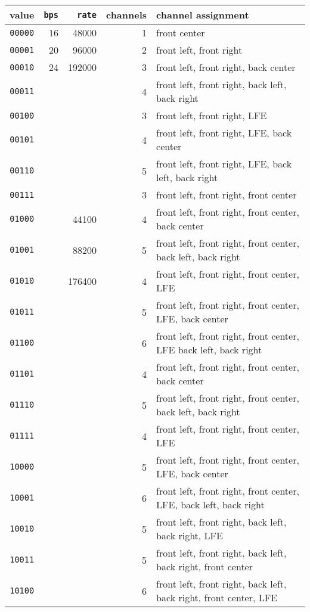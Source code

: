 \begin{small}
  \begin{tabular}{|c|r|r|r|l|}
    \hline
    value & \texttt{bps} & \texttt{rate} & channels & channel assignment \\
    \hline
    \texttt{00000} & 16 & 48000 & 1 & front center \\
    \texttt{00001} & 20 & 96000 & 2 & front left, front right\\
    \texttt{00010} & 24 & 192000 & 3 & front left, front right, back center \\
    \texttt{00011} & & & 4 & front left, front right, back left, back right\\
    \texttt{00100} & & & 3 & front left, front right, LFE \\
    \texttt{00101} & & & 4 & front left, front right, LFE, back center \\
    \texttt{00110} & & & 5 & front left, front right, LFE, back left, back right \\
    \texttt{00111} & & & 3 & front left, front right, front center \\
    \texttt{01000} & & 44100 & 4 & front left, front right, front center, back center \\
    \texttt{01001} & & 88200 & 5 & front left, front right, front center, back left, back right \\
    \texttt{01010} & & 176400 & 4 & front left, front right, front center, LFE\\
    \texttt{01011} & & & 5 & front left, front right, front center, LFE, back center \\
    \texttt{01100} & & & 6 & front left, front right, front center, LFE back left, back right \\
    \texttt{01101} & & & 4 & front left, front right, front center, back center \\
    \texttt{01110} & & & 5 & front left, front right, front center, back left, back right \\
    \texttt{01111} & & & 4 & front left, front right, front center, LFE \\
    \texttt{10000} & & & 5 & front left, front right, front center, LFE, back center \\
    \texttt{10001} & & & 6 & front left, front right, front center, LFE, back left, back right \\
    \texttt{10010} & & & 5 & front left, front right, back left, back right, LFE \\
    \texttt{10011} & & & 5 & front left, front right, back left, back right, front center \\
    \texttt{10100} & & & 6 & front left, front right, back left, back right, front center, LFE \\
    \hline
  \end{tabular}
\end{small}

